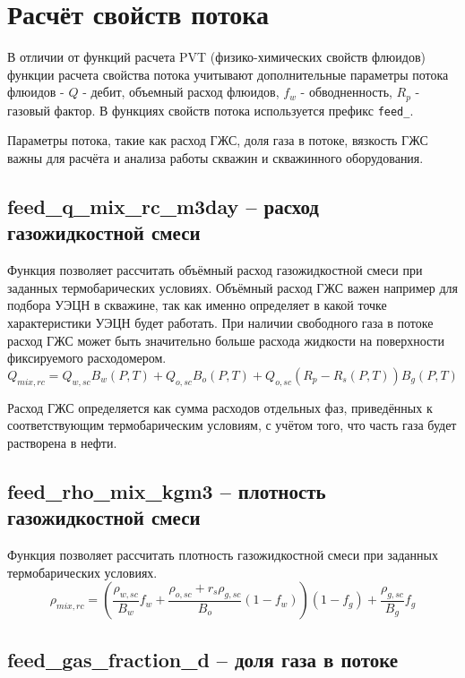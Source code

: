 \section{Расчёт свойств потока}

В отличии от функций расчета PVT (физико-химических свойств флюидов) функции расчета свойства потока учитывают дополнительные параметры потока флюидов - $Q$ - дебит, объемный расход флюидов, $f_w$ - обводненность, $R_p$ - газовый фактор. В функциях свойств потока используется префикс \texttt{feed_}.

Параметры потока, такие как расход ГЖС, доля газа в потоке, вязкость ГЖС важны для расчёта и анализа работы скважин и скважинного оборудования.


\subsection{feed\_q\_mix\_rc\_m3day – расход газожидкостной смеси}

Функция позволяет рассчитать объёмный расход газожидкостной смеси при заданных термобарических условиях. Объёмный расход ГЖС важен например для подбора УЭЦН в скважине, так как именно определяет в какой точке характеристики УЭЦН будет работать. При наличии свободного газа в потоке расход ГЖС может быть значительно больше расхода жидкости на поверхности фиксируемого расходомером.
$$Q_{mix,rc} = Q_{w,sc} B_w(P,T) + Q_{o,sc} B_o(P,T)  + Q_{o,sc}  (R_p - R_s(P,T)) B_g(P,T) $$

Расход ГЖС определяется как сумма расходов отдельных фаз, приведённых к соответствующим термобарическим условиям, с учётом того, что часть газа будет растворена в нефти.


\subsection{feed\_rho\_mix\_kgm3 – плотность газожидкостной смеси}

Функция позволяет рассчитать плотность газожидкостной смеси при заданных термобарических условиях. 
$$\rho_{mix,rc} = \left( \frac{\rho_{w,sc}}{B_w} f_w + \frac{\rho_{o,sc} +r_s \rho_{g,sc} }{B_o}(1-f_w) \right) (1-f_g) + \frac{ \rho_{g,sc} }{B_g} f_g $$


\subsection{feed\_gas\_fraction\_d – доля газа в потоке}

